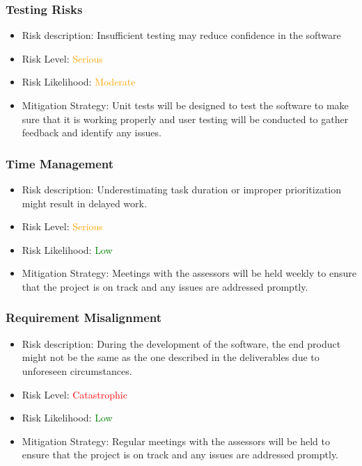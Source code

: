 \documentclass[12pt]{article}
\begin{document}
        \subsubsection{Testing Risks}
        \begin{itemize}
            \item Risk description: Insufficient testing may reduce confidence in the software
            \item Risk Level: \textcolor{orange}{Serious}
            \item Risk Likelihood: \textcolor{orange}{Moderate}
            \item Mitigation Strategy: Unit tests will be designed to test the software to make sure that it is working properly and user testing will be conducted to gather feedback and identify any issues.
        \end{itemize}

        \subsubsection{Time Management}
        \begin{itemize}
            \item Risk description: Underestimating  task duration or improper prioritization might result in delayed work.
            \item Risk Level: \textcolor{orange}{Serious}
            \item Risk Likelihood: \textcolor{green}{Low}
            \item Mitigation Strategy: Meetings with the assessors will be held weekly to ensure that the project is on track and any issues are addressed promptly.
        \end{itemize}

        \subsubsection{Requirement Misalignment}
        \begin{itemize}
            \item Risk description: During the development of the software, the end product might not be the same as the one described in the deliverables due to unforeseen circumstances.
            \item Risk Level: \textcolor{red}{Catastrophic}
            \item Risk Likelihood: \textcolor{green}{Low}
            \item Mitigation Strategy: Regular meetings with the assessors will be held to ensure that the project is on track and any issues are addressed promptly.
        \end{itemize}
\end{document}
